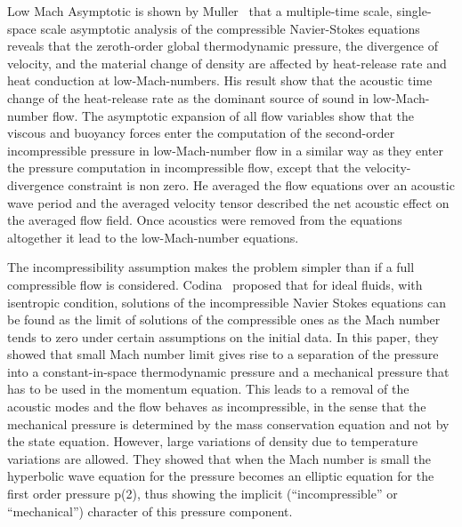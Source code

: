 Low Mach Asymptotic is shown by Muller~\cite{Muller} that a multiple-time scale,
single-space scale asymptotic analysis of the compressible
Navier-Stokes equations reveals that the zeroth-order global
thermodynamic pressure, the divergence of velocity, and the material
change of density are affected by heat-release rate and heat
conduction at low-Mach-numbers. His result show that the acoustic time change of the
heat-release rate as the dominant source of sound in low-Mach-number
flow. The asymptotic expansion of all flow variables show that the
viscous and buoyancy forces enter the computation of the second-order
incompressible pressure in low-Mach-number flow in a similar way as
they enter the pressure computation in incompressible flow, except
that the velocity-divergence constraint is non zero. He averaged the flow
equations over an acoustic wave period and the averaged velocity tensor
described the net acoustic effect on the averaged flow field. Once
acoustics were removed from the equations altogether it lead to the
low-Mach-number equations.

\bigskip
 The incompressibility assumption makes the problem simpler
than if a full compressible flow is considered. Codina~\cite{Codina}
proposed that for ideal fluids, with isentropic condition, solutions
of the incompressible Navier Stokes equations can be found as the
limit of solutions of the compressible ones as the Mach number tends
to zero under certain assumptions on the initial data. In this paper, 
they showed that small Mach number limit
gives rise to a separation of the pressure into a constant-in-space
thermodynamic pressure and a mechanical pressure that has to be used
in the momentum equation. This leads to a removal of the acoustic
modes and the flow behaves as incompressible, in the sense that the
mechanical pressure is determined by the mass conservation equation
and not by the state equation. However, large variations of density
due to temperature variations are allowed. They showed that when the
Mach number is small the hyperbolic wave equation for the pressure
becomes an elliptic equation for the first order pressure p(2), thus
showing the implicit (“incompressible” or “mechanical”) character of
this pressure component.


